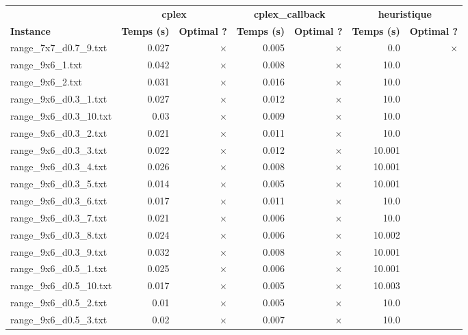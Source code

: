 \documentclass{article}
\begin{document}
\newpage
\begin{center}
\renewcommand{\arraystretch}{1.4} 
 \begin{tabular}{lrrrrrr}
	\hline
 & \multicolumn{2}{c}{\textbf{cplex}} & \multicolumn{2}{c}{\textbf{cplex_callback}} & \multicolumn{2}{c}{\textbf{heuristique}}\\
\textbf{Instance}  & \textbf{Temps (s)} & \textbf{Optimal ?}  & \textbf{Temps (s)} & \textbf{Optimal ?}  & \textbf{Temps (s)} & \textbf{Optimal ?} \\\hline

range\_7x7\_d0.7\_9.txt & 0.027 & 
$\times$
 & 0.005 & 
$\times$
 & 0.0 & 
$\times$
\\
range\_9x6\_1.txt & 0.042 & 
$\times$
 & 0.008 & 
$\times$
 & 10.0 & 
\\
range\_9x6\_2.txt & 0.031 & 
$\times$
 & 0.016 & 
$\times$
 & 10.0 & 
\\
range\_9x6\_d0.3\_1.txt & 0.027 & 
$\times$
 & 0.012 & 
$\times$
 & 10.0 & 
\\
range\_9x6\_d0.3\_10.txt & 0.03 & 
$\times$
 & 0.009 & 
$\times$
 & 10.0 & 
\\
range\_9x6\_d0.3\_2.txt & 0.021 & 
$\times$
 & 0.011 & 
$\times$
 & 10.0 & 
\\
range\_9x6\_d0.3\_3.txt & 0.022 & 
$\times$
 & 0.012 & 
$\times$
 & 10.001 & 
\\
range\_9x6\_d0.3\_4.txt & 0.026 & 
$\times$
 & 0.008 & 
$\times$
 & 10.001 & 
\\
range\_9x6\_d0.3\_5.txt & 0.014 & 
$\times$
 & 0.005 & 
$\times$
 & 10.001 & 
\\
range\_9x6\_d0.3\_6.txt & 0.017 & 
$\times$
 & 0.011 & 
$\times$
 & 10.0 & 
\\
range\_9x6\_d0.3\_7.txt & 0.021 & 
$\times$
 & 0.006 & 
$\times$
 & 10.0 & 
\\
range\_9x6\_d0.3\_8.txt & 0.024 & 
$\times$
 & 0.006 & 
$\times$
 & 10.002 & 
\\
range\_9x6\_d0.3\_9.txt & 0.032 & 
$\times$
 & 0.008 & 
$\times$
 & 10.001 & 
\\
range\_9x6\_d0.5\_1.txt & 0.025 & 
$\times$
 & 0.006 & 
$\times$
 & 10.001 & 
\\
range\_9x6\_d0.5\_10.txt & 0.017 & 
$\times$
 & 0.005 & 
$\times$
 & 10.003 & 
\\
range\_9x6\_d0.5\_2.txt & 0.01 & 
$\times$
 & 0.005 & 
$\times$
 & 10.0 & 
\\
range\_9x6\_d0.5\_3.txt & 0.02 & 
$\times$
 & 0.007 & 
$\times$
 & 10.0 & 
\\

\end{tabular}
\end{center}
\end{document}

